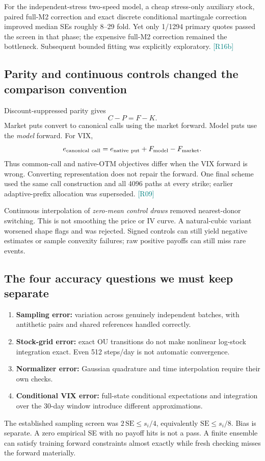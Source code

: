 \documentclass[11pt,a4paper]{article}
\newcommand{\src}[1]{\textcolor{teal}{\small[#1]}}
\begin{document}
For the independent-stress two-speed model, a cheap stress-only auxiliary stock, paired full-M2 correction and exact discrete conditional martingale correction improved median SEs roughly 8--29 fold. Yet only 1/1294 primary quotes passed the screen in that phase; the expensive full-M2 correction remained the bottleneck. Subsequent bounded fitting was explicitly exploratory. \src{R16b}

\subsection{Parity and continuous controls changed the comparison convention}
Discount-suppressed parity gives
\begin{equation}
C-P=F-K.
\end{equation}
Market puts convert to canonical calls using the market forward. Model puts use the \emph{model} forward. For VIX,
\begin{equation}
e_{\rm canonical\ call}=e_{\rm native\ put}+F_{\rm model}-F_{\rm market}.
\end{equation}
Thus common-call and native-OTM objectives differ when the VIX forward is wrong. Converting representation does not repair the forward. One final scheme used the same call construction and all 4096 paths at every strike; earlier adaptive-prefix allocation was superseded. \src{R09}

Continuous interpolation of \emph{zero-mean control draws} removed nearest-donor switching. This is not smoothing the price or IV curve. A natural-cubic variant worsened shape flags and was rejected. Signed controls can still yield negative estimates or sample convexity failures; raw positive payoffs can still miss rare events.

\subsection{The four accuracy questions we must keep separate}
\begin{enumerate}
\item \textbf{Sampling error:} variation across genuinely independent batches, with antithetic pairs and shared references handled correctly.
\item \textbf{Stock-grid error:} exact OU transitions do not make nonlinear log-stock integration exact. Even 512 steps/day is not automatic convergence.
\item \textbf{Normalizer error:} Gaussian quadrature and time interpolation require their own checks.
\item \textbf{Conditional VIX error:} full-state conditional expectations and integration over the 30-day window introduce different approximations.
\end{enumerate}
The established sampling screen was $2\,\mathrm{SE}\leq s_i/4$, equivalently $\mathrm{SE}\leq s_i/8$. Bias is separate. A zero empirical SE with no payoff hits is not a pass. A finite ensemble can satisfy training forward constraints almost exactly while fresh checking misses the forward materially.
\end{document}
